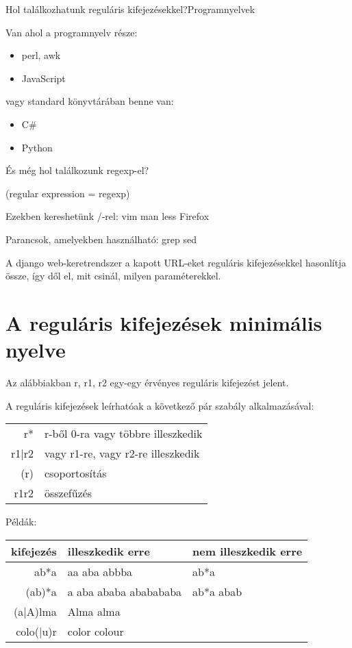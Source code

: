 \documentclass[
    ignorenonframetext
    ]{beamer}
\begin{document}
\begin{frame}[fragile]
    {Hol találkozhatunk reguláris kifejezésekkel?}{Programnyelvek}

    Van ahol a programnyelv része:

    \begin{itemize}
        \item perl, awk
        \item JavaScript
    \end{itemize}

    \vfill
    vagy standard könyvtárában benne van:
    \begin{itemize}
        \item C\#
        \item Python
    \end{itemize}
\end{frame}

\begin{frame}[fragile]
    {És még hol találkozunk regexp-el?}

    (regular expression = regexp)

    \vfill
    Ezekben kereshetünk /-rel: vim man less Firefox

    \vfill
    Parancsok, amelyekben használható: grep sed

    \vfill
    A \alert{django} web-keretrendszer a kapott URL-eket reguláris
    kifejezésekkel hasonlítja össze, így dől el, mit csinál, milyen
    paraméterekkel.
\end{frame}

\section{A reguláris kifejezések minimális nyelve}

\begin{frame}
    Az alábbiakban r, r1, r2 egy-egy érvényes reguláris kifejezést jelent.

    A reguláris kifejezések leírhatóak a következő pár szabály
    alkalmazásával:

    \vfill
    \begin{tabular}{rl}
        r* & r-ből 0-ra vagy többre illeszkedik\\
        r1|r2 & vagy r1-re, vagy r2-re illeszkedik\\
        (r) & csoportosítás\\
        r1r2 & összefűzés\\
    \end{tabular}

    \vfill
    Példák:\\
    \begin{tabular}{rll}
        kifejezés & illeszkedik erre & nem illeszkedik erre\\
        \hline
        ab*a & aa aba abbba & ab*a\\
        (ab)*a & a aba ababa ababababa & ab*a abab\\
        (a|A)lma & Alma alma & \\
        colo(|u)r & color colour& \\
    \end{tabular}
\end{frame}
\end{document}
